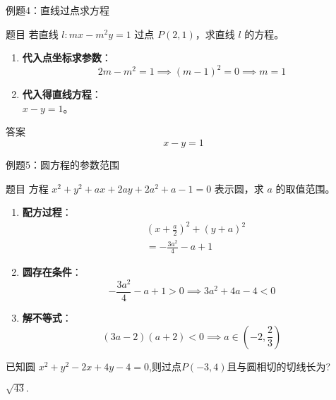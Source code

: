 \begin{frame}{例题4：直线过点求方程}
  \begin{block}{题目}
      若直线 \( l:mx - m^2 y = 1 \) 过点 \( P(2,1) \)，求直线 \( l \) 的方程。
  \end{block}
  \pause
  \begin{enumerate}
      \item \textbf{代入点坐标求参数}：\\
          \[
          2m - m^2 = 1 \implies (m-1)^2 = 0 \implies m = 1
          \]

      \item \textbf{代入得直线方程}：\\
          \( x - y = 1 \)。
  \end{enumerate}


  \begin{block}{答案}
      \[
      \boxed{x - y = 1}
      \]
  \end{block}
\end{frame}
\begin{frame}{例题5：圆方程的参数范围}
  \begin{block}{题目}
      方程 \( x^2 + y^2 + ax + 2ay + 2a^2 + a - 1 = 0 \) 表示圆，求 \( a \) 的取值范围。
  \end{block}

  \begin{enumerate}
      \item \textbf{配方过程}：
          \[
          \begin{aligned}
          &\left(x + \frac{a}{2}\right)^2 + (y + a)^2 \\
          &= -\frac{3a^2}{4} - a + 1
          \end{aligned}
          \]

      \item \textbf{圆存在条件}：
          \[
          -\frac{3a^2}{4} - a + 1 > 0 \implies 3a^2 + 4a - 4 < 0
          \]

      \item \textbf{解不等式}：
          \[
          (3a - 2)(a + 2) < 0 \implies a \in (-2, \frac{2}{3})
          \]
  \end{enumerate}


\end{frame}

  \begin{frame}{}{}
      已知圆 $x^2 +y^2 - 2x +4y -4 = 0$,则过点$P(-3,4)$且与圆相切的切线长为?

      \pause
      $\sqrt{43}.$
  \end{frame}
